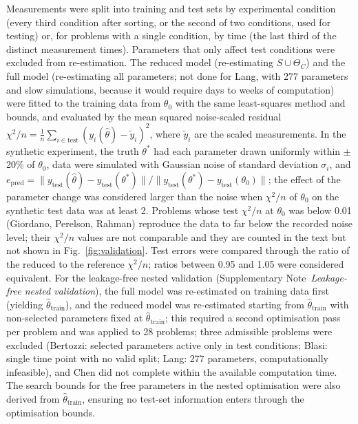 \documentclass[pdflatex,sn-nature]{sn-jnl}
\theoremstyle{plain}
\begin{document}
Measurements were split into training and test sets by experimental condition (every third condition after sorting, or the second of two conditions, used for testing) or, for problems with a single condition, by time (the last third of the distinct measurement times). Parameters that only affect test conditions were excluded from re-estimation. The reduced model (re-estimating $S\cup\Theta_C$) and the full model (re-estimating all parameters; not done for Lang, with 277 parameters and slow simulations, because it would require days to weeks of computation) were fitted to the training data from $\theta_0$ with the same least-squares method and bounds, and evaluated by the mean squared noise-scaled residual $\chi^2/n=\frac{1}{n}\sum_{i\in\mathrm{test}}(y_i(\hat\theta)-\tilde y_i)^2$, where $\tilde y_i$ are the scaled measurements. In the synthetic experiment, the truth $\theta^\ast$ had each parameter drawn uniformly within $\pm$20\% of $\theta_0$, data were simulated with Gaussian noise of standard deviation $\sigma_i$, and $e_{\mathrm{pred}}=\|y_{\mathrm{test}}(\hat\theta)-y_{\mathrm{test}}(\theta^\ast)\|/\|y_{\mathrm{test}}(\theta^\ast)-y_{\mathrm{test}}(\theta_0)\|$; the effect of the parameter change was considered larger than the noise when $\chi^2/n$ of $\theta_0$ on the synthetic test data was at least 2. Problems whose test $\chi^2/n$ at $\theta_0$ was below 0.01 (Giordano, Perelson, Rahman) reproduce the data to far below the recorded noise level; their $\chi^2/n$ values are not comparable and they are counted in the text but not shown in Fig.~\ref{fig:validation}. Test errors were compared through the ratio of the reduced to the reference $\chi^2/n$; ratios between 0.95 and 1.05 were considered equivalent. For the leakage-free nested validation (Supplementary Note~\textit{Leakage-free nested validation}), the full model was re-estimated on training data first (yielding $\hat\theta_{\mathrm{train}}$), and the reduced model was re-estimated starting from $\hat\theta_{\mathrm{train}}$ with non-selected parameters fixed at $\hat\theta_{\mathrm{train}}$; this required a second optimisation pass per problem and was applied to 28 problems; three admissible problems were excluded (Bertozzi: selected parameters active only in test conditions; Blasi: single time point with no valid split; Lang: 277 parameters, computationally infeasible), and Chen did not complete within the available computation time. The search bounds for the free parameters in the nested optimisation were also derived from $\hat\theta_{\mathrm{train}}$, ensuring no test-set information enters through the optimisation bounds.
\end{document}
